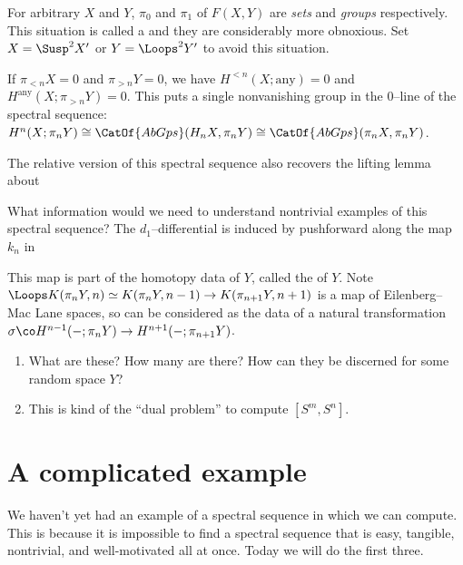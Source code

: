 \begin{remark}
For arbitrary $X$ and $Y$, $\pi_0$ and $\pi_1$ of $F(X, Y)$ are \emph{sets} and \emph{groups} respectively.  This situation is called a  and they are considerably more obnoxious.  Set $X = \Susp^2 X'$ or $Y = \Loops^2 Y'$ to avoid this situation.
\end{remark}

\begin{remark}
If $\pi_{< n} X = 0$ and $\pi_{> n} Y = 0$, we have $H^{< n}(X; \text{any}) = 0$ and $H^{\text{any}}(X; \pi_{> n} Y) = 0$.  This puts a single nonvanishing group in the $0$--line of the spectral sequence: $H^n(X; \pi_n Y) \cong \CatOf{AbGps}(H_n X, \pi_n Y) \cong \CatOf{AbGps}(\pi_n X, \pi_n Y)$.
\end{remark}

\begin{remark}
The relative version of this spectral sequence also recovers the lifting lemma about 
\end{remark}

What information would we need to understand nontrivial examples of this spectral sequence?  The $d_1$--differential is induced by pushforward along the map $k_n$ in
\begin{center}
\end{center}
This map is part of the homotopy data of $Y$, called the  of $Y$.  Note $\Loops K(\pi_n Y, n) \simeq K(\pi_n Y, n-1) \to K(\pi_{n+1} Y, n+1)$ is a map of Eilenberg--Mac Lane spaces, so can be considered as the data of a natural transformation $\sigma\co H^{n-1}(-; \pi_n Y) \to H^{n+1}(-; \pi_{n+1} Y)$.

\begin{enumerate}
    \item What are these? How many are there? How can they be discerned for some random space $Y$?
    \item This is kind of the ``dual problem'' to compute $[S^m, S^n]$.
\end{enumerate}




\section{A complicated example}

We haven't yet had an example of a spectral sequence in which we can compute.  This is because it is impossible to find a spectral sequence that is easy, tangible, nontrivial, and well-motivated all at once.  Today we will do the first three.

